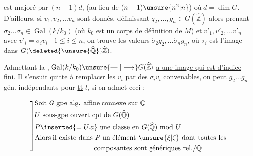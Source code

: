 est majoré par $(n-1)d$, (au lieu de $(n-1)\unsure{n^2|n}$) où $d=\dim G$.  D'ailleurs, si $v_1,v_2,\ldots v_n$ sont donnés,   définissant $g_2,\ldots,g_n\in G(\widehat{\mathbb Z})$
alors prenant $\sigma_2\ldots\sigma_n\in\operatorname{Gal}(k/k_0)$ (où $k_0$ est un corps de définition  de $M$) et $v'_1,v'_2,\ldots v'_n$ avec $v'_i=\sigma_i v_i\quad 1\leq i\leq n$, on trouve les valeurs  $\dot{\sigma}_2g_2,\ldots\dot{\sigma}_ng_n$, où $\dot{\sigma}_i$ est l'image dans $G(\deleted{\unsure{\widehat{\mathbb Q}}}\widehat{\mathbb Z})$. 

Admettant la , $\operatorname{Gal}(k/k_0)\unsure{\mathrel{\text{---}}|\longrightarrow}G(\widehat{\mathbb Z})$ \uline{a une image qui est d'indice fini.}
Il s'ensuit  quitte à remplacer les $v_i$ par des $\sigma_i v_i$ convenables, on peut   $g_2\ldots g_n$ gén. indépendants pour \uline{tt} $l$, si on admet ceci :

\[
\left]\begin{aligned}
&\text{Soit }G\ \text{gpe alg. affine connexe sur }\mathbb Q\\
&U\ \text{sous-gpe ouvert cpt de }G(\widehat{\mathbb Q})\\
&P\inserted{=U.a}\ \text{une classe en }G(\widehat{\mathbb Q})\ \text{mod }U\\
&\text{Alors il existe dans }P\ \text{un élément }\unsure{\xi|\zeta}\ \text{dont toutes les}\\
&\hspace{3cm}\text{composantes sont génériques rel./}\mathbb Q
\end{aligned}\right.
\]
